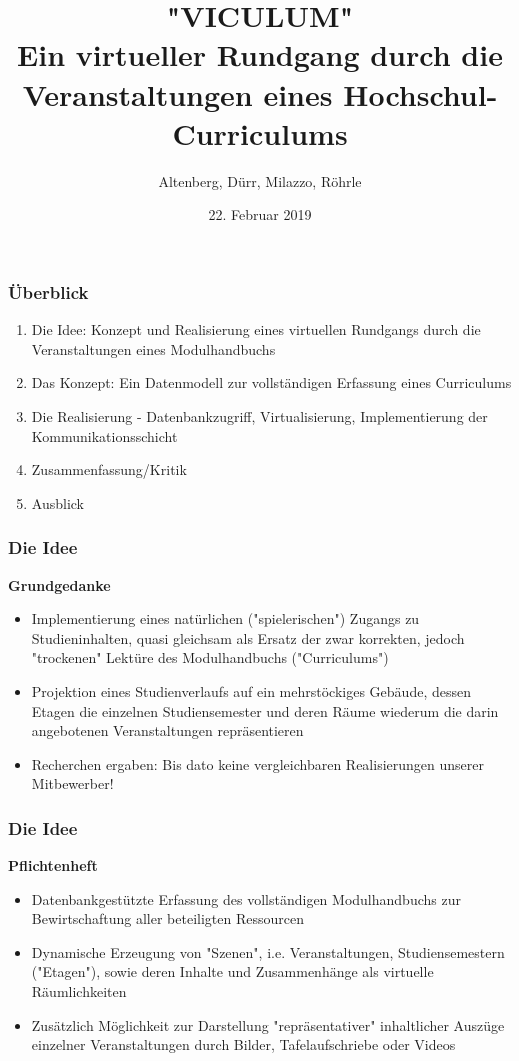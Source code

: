 \documentclass{beamer}
\title[Viculum]{"VICULUM" \\ Ein virtueller Rundgang durch die Veranstaltungen eines Hochschul-Curriculums } %
\author{Altenberg, Dürr, Milazzo, Röhrle}
\institute[]
{
Hochschule Albstadt-Sigmaringen \\ %
\medskip
\textit{Fabian Altenberg (WIN), altenbfa@hs-albsig.de} %
\newline
\textit{Maik Dürr (TI), duerrmai@hs-albsig.de} %
\newline
\textit{Domenico Milazzo (TI), milazzdo@hs-albsig.de} %
\newline
\textit{Prof. Dr. Jörg Röhrle, roehrle@hs-albsig.de} %
\newline
}
\date{22. Februar 2019} %
\begin{document}
\begin{frame}
\titlepage %
\end{frame}

\begin{frame}
\frametitle{Überblick}
\begin{enumerate}
\item Die Idee: Konzept und Realisierung eines virtuellen Rundgangs durch die Veranstaltungen eines Modulhandbuchs 
\item Das Konzept: Ein Datenmodell zur vollständigen Erfassung eines Curriculums 
\item Die Realisierung - Datenbankzugriff, Virtualisierung, Implementierung der Kommunikationsschicht
\item Zusammenfassung/Kritik
\item Ausblick
\end{enumerate}
\end{frame}


\begin{frame}
\frametitle{Die Idee}
\textbf{Grundgedanke}
\begin{itemize}
\item Implementierung eines natürlichen ("spielerischen") Zugangs zu Studieninhalten, quasi gleichsam als Ersatz der zwar korrekten, jedoch "trockenen" Lektüre des Modulhandbuchs ("Curriculums")
\item Projektion eines Studienverlaufs auf ein mehrstöckiges Gebäude, dessen Etagen die einzelnen Studiensemester und deren Räume wiederum die darin angebotenen Veranstaltungen repräsentieren 
\item Recherchen ergaben:  Bis dato keine vergleichbaren Realisierungen unserer Mitbewerber!
\end{itemize}
\end{frame}


\begin{frame}
\frametitle{Die Idee}
\textbf{Pflichtenheft}
\begin{itemize}
\item Datenbankgestützte Erfassung des vollständigen Modulhandbuchs zur Bewirtschaftung aller beteiligten Ressourcen 
\item Dynamische Erzeugung von "Szenen", i.e. Veranstaltungen, Studiensemestern ("Etagen"), sowie deren Inhalte und  Zusammenhänge als virtuelle Räumlichkeiten 
\item Zusätzlich Möglichkeit zur Darstellung "repräsentativer" inhaltlicher Auszüge einzelner Veranstaltungen durch Bilder, Tafelaufschriebe oder Videos
\end{itemize}
\end{frame}
\end{document}
